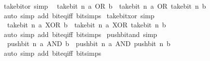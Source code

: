 \begin{isabellebody}
%
\endisadelimproof
\isanewline
{}\isamarkupfalse%
\ take{\isacharunderscore}{\kern0pt}bit{\isacharunderscore}{\kern0pt}or\ {\isacharbrackleft}{\kern0pt}simp{\isacharbrackright}{\kern0pt}{\isacharcolon}{\kern0pt}\isanewline
\ \ {\isacartoucheopen}take{\isacharunderscore}{\kern0pt}bit\ n\ {\isacharparenleft}{\kern0pt}a\ OR\ b{\isacharparenright}{\kern0pt}\ {\isacharequal}{\kern0pt}\ take{\isacharunderscore}{\kern0pt}bit\ n\ a\ OR\ take{\isacharunderscore}{\kern0pt}bit\ n\ b{\isacartoucheclose}\isanewline
%
\isadelimproof
\ \ %
\endisadelimproof
%
\isatagproof
{}\isamarkupfalse%
\ {\isacharparenleft}{\kern0pt}auto\ simp\ add{\isacharcolon}{\kern0pt}\ bit{\isacharunderscore}{\kern0pt}eq{\isacharunderscore}{\kern0pt}iff\ bit{\isacharunderscore}{\kern0pt}simps{\isacharparenright}{\kern0pt}%
\endisatagproof
{\isafoldproof}%
%
\isadelimproof
\isanewline
%
\endisadelimproof
\isanewline
{}\isamarkupfalse%
\ take{\isacharunderscore}{\kern0pt}bit{\isacharunderscore}{\kern0pt}xor\ {\isacharbrackleft}{\kern0pt}simp{\isacharbrackright}{\kern0pt}{\isacharcolon}{\kern0pt}\isanewline
\ \ {\isacartoucheopen}take{\isacharunderscore}{\kern0pt}bit\ n\ {\isacharparenleft}{\kern0pt}a\ XOR\ b{\isacharparenright}{\kern0pt}\ {\isacharequal}{\kern0pt}\ take{\isacharunderscore}{\kern0pt}bit\ n\ a\ XOR\ take{\isacharunderscore}{\kern0pt}bit\ n\ b{\isacartoucheclose}\isanewline
%
\isadelimproof
\ \ %
\endisadelimproof
%
\isatagproof
{}\isamarkupfalse%
\ {\isacharparenleft}{\kern0pt}auto\ simp\ add{\isacharcolon}{\kern0pt}\ bit{\isacharunderscore}{\kern0pt}eq{\isacharunderscore}{\kern0pt}iff\ bit{\isacharunderscore}{\kern0pt}simps{\isacharparenright}{\kern0pt}%
\endisatagproof
{\isafoldproof}%
%
\isadelimproof
\isanewline
%
\endisadelimproof
\isanewline
{}\isamarkupfalse%
\ push{\isacharunderscore}{\kern0pt}bit{\isacharunderscore}{\kern0pt}and\ {\isacharbrackleft}{\kern0pt}simp{\isacharbrackright}{\kern0pt}{\isacharcolon}{\kern0pt}\isanewline
\ \ {\isacartoucheopen}push{\isacharunderscore}{\kern0pt}bit\ n\ {\isacharparenleft}{\kern0pt}a\ AND\ b{\isacharparenright}{\kern0pt}\ {\isacharequal}{\kern0pt}\ push{\isacharunderscore}{\kern0pt}bit\ n\ a\ AND\ push{\isacharunderscore}{\kern0pt}bit\ n\ b{\isacartoucheclose}\isanewline
%
\isadelimproof
\ \ %
\endisadelimproof
%
\isatagproof
{}\isamarkupfalse%
\ {\isacharparenleft}{\kern0pt}auto\ simp\ add{\isacharcolon}{\kern0pt}\ bit{\isacharunderscore}{\kern0pt}eq{\isacharunderscore}{\kern0pt}iff\ bit{\isacharunderscore}{\kern0pt}simps{\isacharparenright}{\kern0pt}%

\end{isabellebody}
